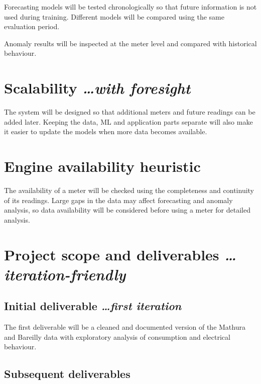 \documentclass[11pt,a4paper]{article}
\newcommand{\BvrHint}[1]{%
  {\normalfont\normalsize\itshape\hfill #1}}
\begin{document}
Forecasting models will be tested chronologically so that future
information is not used during training. Different models will be
compared using the same evaluation period.

Anomaly results will be inspected at the meter level and compared
with historical behaviour.

\section{Scalability %
  \BvrHint{\ldots with foresight}}

The system will be designed so that additional meters and future
readings can be added later. Keeping the data, ML and application
parts separate will also make it easier to update the models when
more data becomes available.

\section{Engine availability heuristic}

The availability of a meter will be checked using the completeness
and continuity of its readings. Large gaps in the data may affect
forecasting and anomaly analysis, so data availability will be
considered before using a meter for detailed analysis.

\section{Project scope and deliverables %
  \BvrHint{\ldots iteration-friendly}}

\subsection{Initial deliverable %
  \BvrHint{\ldots first iteration}}

The first deliverable will be a cleaned and documented version of
the Mathura and Bareilly data with exploratory analysis of
consumption and electrical behaviour.

\subsection{Subsequent deliverables}
\end{document}

